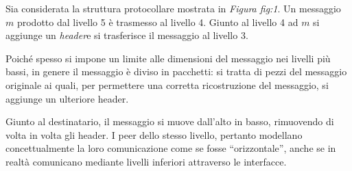 \documentclass{subfiles}
\begin{document}
Sia considerata la struttura protocollare mostrata in \emph{Figura \emph{fig:1}}.
Un messaggio \(m\) prodotto dal livello 5 è trasmesso al livello 4.
Giunto al livello 4 ad \(m\) si aggiunge un \emph{header}\footnotemark[1] e si trasferisce il messaggio al livello 3.

Poiché spesso si impone un limite alle dimensioni del messaggio nei livelli più bassi, in genere il messaggio è diviso in pacchetti:
si tratta di pezzi del messaggio originale ai quali, per permettere una corretta ricostruzione del messaggio, si aggiunge un ulteriore header.

Giunto al destinatario, il messaggio si muove dall'alto in basso, rimuovendo di volta in volta gli header.
I peer dello stesso livello, pertanto modellano concettualmente la loro comunicazione come se fosse “orizzontale”,
anche se in realtà comunicano mediante livelli inferiori attraverso le interfacce.


\end{document}
